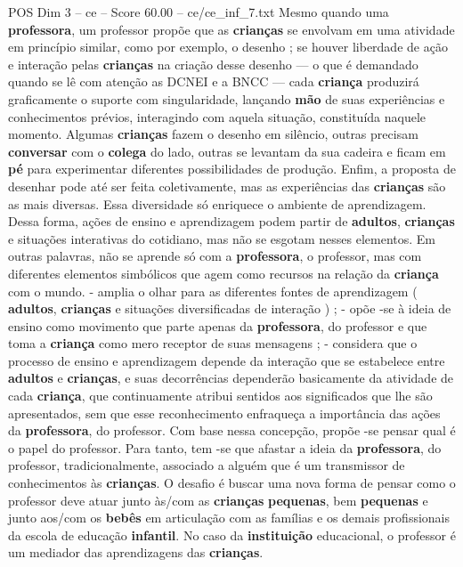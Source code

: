 \begin{textsample}{POS Dim 3 – ce – Score 60.00 – ce/ce\_inf\_7.txt}
Mesmo quando uma \textbf{professora}, um professor propõe que as \textbf{crianças} se envolvam em uma atividade em princípio similar, como por exemplo, o desenho ; se houver liberdade de ação e interação pelas \textbf{crianças} na criação desse desenho — o que é demandado quando se lê com atenção as DCNEI e a BNCC — cada \textbf{criança} produzirá graficamente o suporte com singularidade, lançando \textbf{mão} de suas experiências e conhecimentos prévios, interagindo com aquela situação, constituída naquele momento.
Algumas \textbf{crianças} fazem o desenho em silêncio, outras precisam \textbf{conversar} com o \textbf{colega} do lado, outras se levantam da sua cadeira e ficam em \textbf{pé} para experimentar diferentes possibilidades de produção.
Enfim, a proposta de desenhar pode até ser feita coletivamente, mas as experiências das \textbf{crianças} são as mais diversas.
Essa diversidade só enriquece o ambiente de aprendizagem.
Dessa forma, ações de ensino e aprendizagem podem partir de \textbf{adultos}, \textbf{crianças} e situações interativas do cotidiano, mas não se esgotam nesses elementos.
Em outras palavras, não se aprende só com a \textbf{professora}, o professor, mas com diferentes elementos simbólicos que agem como recursos na relação da \textbf{criança} com o mundo. - amplia o olhar para as diferentes fontes de aprendizagem ( \textbf{adultos}, \textbf{crianças} e situações diversificadas de interação ) ; - opõe -se à ideia de ensino como movimento que parte apenas da \textbf{professora}, do professor e que toma a \textbf{criança} como mero receptor de suas mensagens ; - considera que o processo de ensino e aprendizagem depende da interação que se estabelece entre \textbf{adultos} e \textbf{crianças}, e suas decorrências dependerão basicamente da atividade de cada \textbf{criança}, que continuamente atribui sentidos aos significados que lhe são apresentados, sem que esse reconhecimento enfraqueça a importância das ações da \textbf{professora}, do professor.
Com base nessa concepção, propõe -se pensar qual é o papel do professor.
Para tanto, tem -se que afastar a ideia da \textbf{professora}, do professor, tradicionalmente, associado a alguém que é um transmissor de conhecimentos às \textbf{crianças}.
O desafio é buscar uma nova forma de pensar como o professor deve atuar junto às/com as \textbf{crianças} \textbf{pequenas}, bem \textbf{pequenas} e junto aos/com os \textbf{bebês} em articulação com as famílias e os demais profissionais da escola de educação \textbf{infantil}.
No caso da \textbf{instituição} educacional, o professor é um mediador das aprendizagens das \textbf{crianças}.

\end{textsample}
